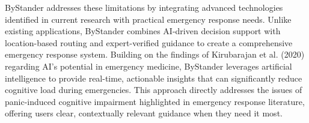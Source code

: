 ByStander addresses these limitations by integrating advanced technologies identified in current research with practical emergency response needs. Unlike existing applications, ByStander combines AI-driven decision support with location-based routing and expert-verified guidance to create a comprehensive emergency response system. Building on the findings of Kirubarajan et al. (2020) regarding AI's potential in emergency medicine, ByStander leverages artificial intelligence to provide real-time, actionable insights that can significantly reduce cognitive load during emergencies. This approach directly addresses the issues of panic-induced cognitive impairment highlighted in emergency response literature, offering users clear, contextually relevant guidance when they need it most.

